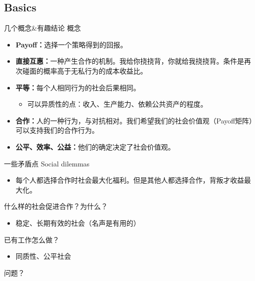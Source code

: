 \documentclass{beamer}
\begin{document}
\subsection{Basics}
\begin{frame}{几个概念\&有趣结论}
概念
\begin{itemize}
    \item \textbf{Payoff：}选择一个策略得到的回报。
    \item \textbf{直接互惠：}一种产生合作的机制。我给你挠挠背，你就给我挠挠背。条件是再次碰面的概率高于无私行为的成本收益比。
    \item \textbf{平等：}每个人相同行为的社会后果相同。
    \begin{itemize}
        \item 可以异质性的点：收入、生产能力、依赖公共资产的程度。
    \end{itemize}
    \item \textbf{合作：}人的一种行为，与对抗相对。我们希望我们的社会价值观（Payoff矩阵）可以支持我们的合作行为。
    \item \textbf{公平、效率、公益：}他们的确定决定了社会价值观。
    \end{itemize}
    
\end{frame}
\begin{frame}{一些矛盾点}
Social dilemmas
\begin{itemize}
    \item 每个人都选择合作时社会最大化福利。但是其他人都选择合作，背叛才收益最大化。
\end{itemize}

什么样的社会促进合作？为什么？

\begin{itemize}
    \item 稳定、长期有效的社会（名声是有用的）
\end{itemize}

已有工作怎么做？

\begin{itemize}
    \item 同质性、公平社会
\end{itemize}

问题？
    
\end{frame}
\end{document}
